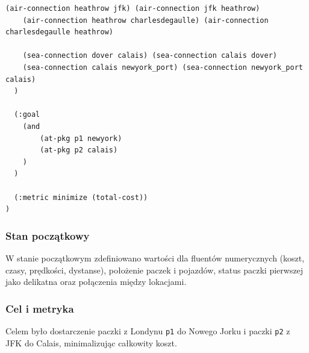 \documentclass[11pt,a4paper]{article}
\begin{document}
\begin{lstlisting}[caption=Definicja problemu zadania 1, label=lst:obj_task1]
    (air-connection heathrow jfk) (air-connection jfk heathrow)
    (air-connection heathrow charlesdegaulle) (air-connection charlesdegaulle heathrow)

    (sea-connection dover calais) (sea-connection calais dover)
    (sea-connection calais newyork_port) (sea-connection newyork_port calais)
  )

  (:goal
    (and
        (at-pkg p1 newyork)
        (at-pkg p2 calais)
    )
  )

  (:metric minimize (total-cost)) 
)
\end{lstlisting}

\subsubsection{Stan początkowy}
W stanie początkowym zdefiniowano wartości dla fluentów numerycznych (koszt, czasy, prędkości, dystanse), położenie paczek i pojazdów, status paczki pierwszej jako delikatna oraz połączenia między lokacjami.

\subsubsection{Cel i metryka}
Celem było dostarczenie paczki z Londynu \texttt{p1} do Nowego Jorku i paczki \texttt{p2} z JFK do Calais, minimalizując całkowity koszt.
\end{document}
